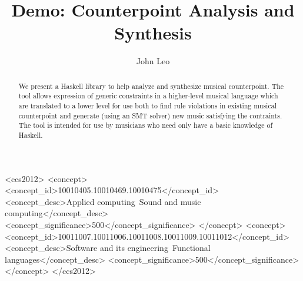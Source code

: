 \documentclass[sigplan,screen]{acmart}
\begin{document}
\title{Demo: Counterpoint Analysis and Synthesis}


\author{John Leo}


\begin{abstract}
We present a Haskell library to help analyze
and synthesize musical counterpoint. The tool allows expression of
generic constraints in a higher-level musical language which are
translated to a lower level for use both to find rule violations in
existing musical counterpoint and generate (using an SMT solver) new
music satisfying the contraints. The tool is intended for use by
musicians who need only have a basic knowledge of Haskell.
\end{abstract}


\begin{CCSXML}
<ccs2012>
<concept>
<concept_id>10010405.10010469.10010475</concept_id>
<concept_desc>Applied computing~Sound and music computing</concept_desc>
<concept_significance>500</concept_significance>
</concept>
<concept>
<concept_id>10011007.10011006.10011008.10011009.10011012</concept_id>
<concept_desc>Software and its engineering~Functional languages</concept_desc>
<concept_significance>500</concept_significance>
</concept>
</ccs2012>
\end{CCSXML}




\maketitle
\end{document}

